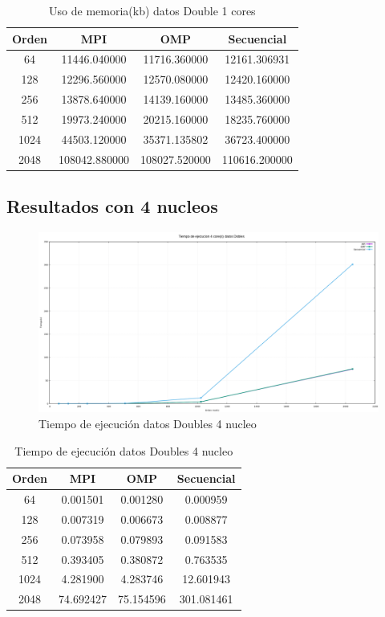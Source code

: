 \documentclass[10pt]{IEEEtran}
\begin{document}
\begin{table}[H]
  \caption{Uso de memoria(kb) datos Double 1 cores}
  \label{table_example}
  \centering
  \begin{tabular}{|c|c|c|c|}
    \hline
    \textbf{Orden} & \textbf{MPI} & \textbf{OMP} & \textbf{Secuencial} \\
    \hline
    64 & 11446.040000 & 11716.360000 & 12161.306931 \\
    128 & 12296.560000 & 12570.080000 & 12420.160000 \\
    256 & 13878.640000 & 14139.160000 & 13485.360000 \\
    512 & 19973.240000 & 20215.160000 & 18235.760000 \\
    1024 & 44503.120000 & 35371.135802 & 36723.400000 \\
    2048 & 108042.880000 & 108027.520000 & 110616.200000 \\
    \hline
  \end{tabular}
\end{table}

\subsection{Resultados con 4 nucleos}

\begin{figure}[H]
  \centering
  \includegraphics[width=0.95\linewidth]{figs/4nucleosDoblesTiempo.png}
  \caption{Tiempo de ejecución datos Doubles 4 nucleo}
  \label{fig:d}
\end{figure}

\begin{table}[H]
  \caption{Tiempo de ejecución datos Doubles 4 nucleo}
  \label{table_example}
  \centering
  \begin{tabular}{|c|c|c|c|}
    \hline
    \textbf{Orden} & \textbf{MPI} & \textbf{OMP} & \textbf{Secuencial} \\
    \hline
    64 & 0.001501 & 0.001280 & 0.000959 \\
    128 & 0.007319 & 0.006673 & 0.008877 \\
    256 & 0.073958 & 0.079893 & 0.091583 \\
    512 & 0.393405 & 0.380872 & 0.763535 \\
    1024 & 4.281900 & 4.283746 & 12.601943 \\
    2048 & 74.692427 & 75.154596 & 301.081461 \\
    \hline
  \end{tabular}
\end{table}
\end{document}
